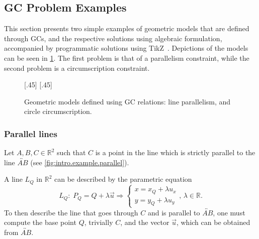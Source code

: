 \subsection{\Acl{GC} Problem Examples}%
\label{sec:intro.examples}

This section presents two simple examples of geometric models that are defined
through \acp{GC}, and the respective solutions using algebraic formulation,
accompanied by programmatic solutions using \ac{TikZ}~\cite{Tantau:2021:TikZ}.
Depictions of the models can be seen in \cref{fig:intro.example}.  The first
problem is that of a parallelism constraint, while the second problem is a
circumscription constraint.

\begin{figure}[htpb]
    [.45\linewidth]{\resizebox{\linewidth}{!}{%
      }}
  \hspace{\fill}
    [.45\linewidth]{\resizebox{\linewidth}{!}{%
      }}
  \caption[Geometric models defined using GCs]{
    Geometric models defined using \ac{GC} relations:
     line parallelism, and
     circle circumscription.}%
  \label{fig:intro.example}
\end{figure}

\subsubsection{Parallel lines}%
\label{sec:intro.examples.parallel}

Let $A, B, C \in \mathbb{R}^2$ such that $C$ is a point in the line which is
strictly parallel to the line $\overleftrightarrow{AB}$ (see
\cref{fig:intro.example.parallel}).

A line $L_Q$ in $\mathbb{R}^2$ can be described by the parametric equation
\begin{equation}\label{eq:line.parametric.2}
  L_Q\!:\; P_Q = Q + \lambda\vec{u} \Rightarrow
  \begin{cases}
    x = x_Q + \lambda u_x \\
    y = y_Q + \lambda u_y
  \end{cases},\,\lambda \in \mathbb{R}.
\end{equation}
To then describe the line that goes through $C$ and is parallel to
$\overleftrightarrow{AB}$, one must compute the base point $Q$, trivially $C$,
and the vector $\vec{u}$, which can be obtained from $\overleftrightarrow{AB}$.

